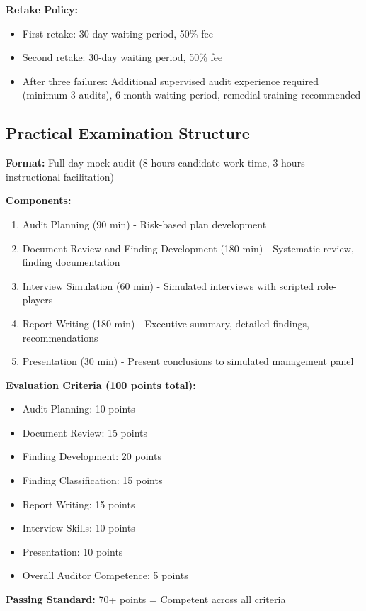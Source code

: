 \documentclass[11pt,a4paper]{article}
\begin{document}
\textbf{Retake Policy:}
\begin{itemize}
\item First retake: 30-day waiting period, 50\% fee
\item Second retake: 30-day waiting period, 50\% fee
\item After three failures: Additional supervised audit experience required (minimum 3 audits), 6-month waiting period, remedial training recommended
\end{itemize}

\subsection{Practical Examination Structure}

\textbf{Format:} Full-day mock audit (8 hours candidate work time, 3 hours instructional facilitation)

\textbf{Components:}
\begin{enumerate}
\item Audit Planning (90 min) - Risk-based plan development
\item Document Review and Finding Development (180 min) - Systematic review, finding documentation
\item Interview Simulation (60 min) - Simulated interviews with scripted role-players
\item Report Writing (180 min) - Executive summary, detailed findings, recommendations
\item Presentation (30 min) - Present conclusions to simulated management panel
\end{enumerate}

\textbf{Evaluation Criteria (100 points total):}
\begin{itemize}
\item Audit Planning: 10 points
\item Document Review: 15 points
\item Finding Development: 20 points
\item Finding Classification: 15 points
\item Report Writing: 15 points
\item Interview Skills: 10 points
\item Presentation: 10 points
\item Overall Auditor Competence: 5 points
\end{itemize}

\textbf{Passing Standard:} 70+ points = Competent across all criteria
\end{document}

